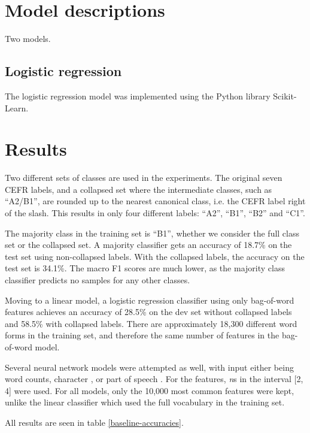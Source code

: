\section{Model descriptions}

Two models.

\subsection{Logistic regression}

The logistic regression model was implemented using the Python
library Scikit-Learn.

\section{Results}

Two different sets of classes are used in the experiments. The original seven
CEFR labels, and a collapsed set where the intermediate classes, such as
``A2/B1'', are rounded up to the nearest canonical class, i.e. the CEFR label
right of the slash. This results in only four different labels: ``A2'',
``B1'', ``B2'' and ``C1''.

The majority class in the training set is ``B1'', whether we consider the
full class set or the collapsed set. A majority classifier gets an
accuracy of 18.7\% on the test set using non-collapsed labels. With the
collapsed labels, the accuracy on the test set is 34.1\%. The macro F1
scores are much lower, as the majority class classifier predicts no
samples for any other classes.

Moving to a linear model, a logistic regression classifier using only
bag-of-word features achieves an accuracy of 28.5\% on the dev set without
collapsed labels and 58.5\% with collapsed labels. There are approximately
18,300 different word forms in the training set, and therefore the same
number of features in the bag-of-word model.

Several neural network models were attempted as well, with input either being
word counts, character \ngrams, or part of speech \ngrams. For the \ngram
features, \textit{n}s in the interval [2, 4] were used. For all models, only
the 10,000 most common features were kept, unlike the linear classifier which
used the full vocabulary in the training set.

All results are seen in table \ref{baseline-accuracies}.

